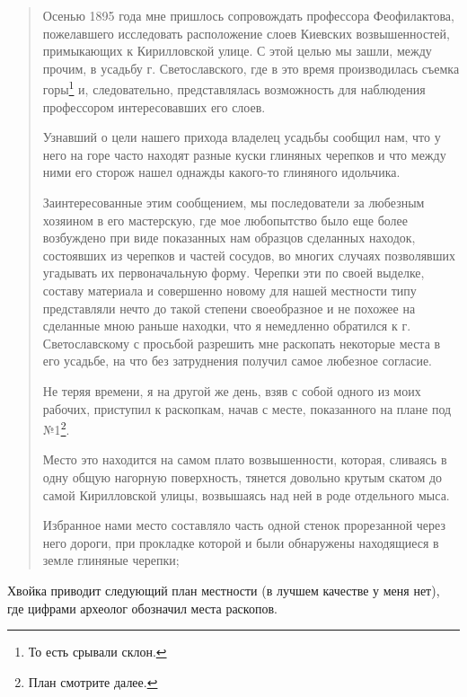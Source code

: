 \begin{quotation}
Осенью 1895 года мне пришлось сопровождать профессора Феофилактова, пожелавшего исследовать расположение слоев Киевских возвышенностей, примыкающих к Кирилловской улице. С этой целью мы зашли, между прочим, в усадьбу г. Светославского, где в это время производилась съемка горы\footnote{То есть срывали склон.} и, следовательно, представлялась возможность для наблюдения профессором интересовавших его слоев.

Узнавший о цели нашего прихода владелец усадьбы сообщил нам, что у него на горе часто находят разные куски глиняных черепков и что между ними его сторож нашел однажды какого-то глиняного идольчика.

Заинтересованные этим сообщением, мы последователи за любезным хозяином в его мастерскую, где мое любопытство было еще более возбуждено при виде показанных нам образцов сделанных находок, состоявших из черепков и частей сосудов, во многих случаях позволявших угадывать их первоначальную форму. Черепки эти по своей выделке, составу материала и совершенно новому для нашей местности типу представляли нечто до такой степени своеобразное и не похожее на сделанные мною раньше находки, что я немедленно обратился к г. Светославскому с просьбой разрешить мне раскопать некоторые места в его усадьбе, на что без затруднения получил самое любезное согласие.

Не теряя времени, я на другой же день, взяв с собой одного из моих рабочих, приступил к раскопкам, начав с месте, показанного на плане под №1\footnote{План смотрите далее.}.

Место это находится на самом плато возвышенности, которая, сливаясь в одну общую нагорную поверхность, тянется довольно крутым скатом до самой Кирилловской улицы, возвышаясь над ней в роде отдельного мыса.

Избранное нами место составляло часть одной стенок прорезанной через него дороги, при прокладке которой и были обнаружены находящиеся в земле глиняные черепки; 
\end{quotation}

Хвойка приводит следующий план местности (в лучшем качестве у меня нет), где цифрами археолог обозначил места раскопов.

